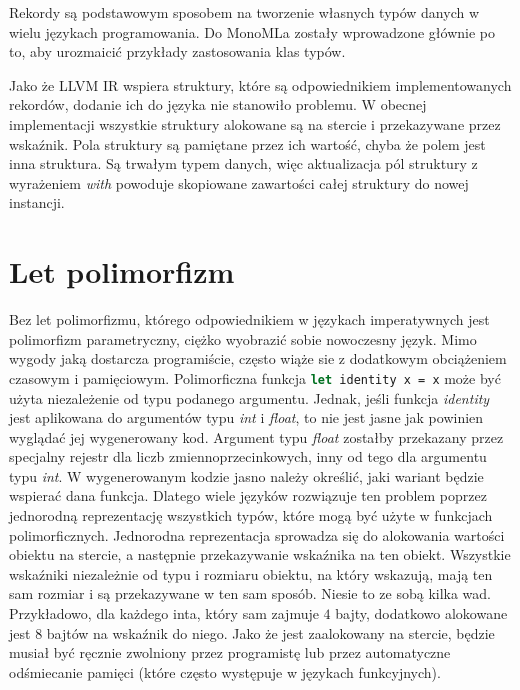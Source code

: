 \documentclass[declaration,shortabstract]{iithesis}
\begin{document}
Rekordy są podstawowym sposobem na tworzenie własnych typów danych w wielu 
językach programowania. Do MonoMLa zostały wprowadzone głównie po to, 
aby urozmaicić przykłady zastosowania klas typów. 

Jako że LLVM IR wspiera struktury, które są odpowiednikiem implementowanych 
rekordów, dodanie ich do języka nie stanowiło problemu. W obecnej 
implementacji 
wszystkie struktury alokowane są na stercie i przekazywane przez wskaźnik.
Pola struktury są pamiętane przez ich wartość, chyba że polem jest inna 
struktura. Są trwałym typem danych, więc aktualizacja pól struktury 
z wyrażeniem \textit{with} powoduje skopiowane zawartości całej struktury do 
nowej instancji.

\section{Let polimorfizm}


Bez let polimorfizmu, którego odpowiednikiem w językach imperatywnych jest 
polimorfizm parametryczny, ciężko wyobrazić sobie nowoczesny język. 
Mimo wygody jaką dostarcza programiście, często wiąże sie z dodatkowym
obciążeniem czasowym i pamięciowym. Polimorficzna funkcja 
\lstinline[language=Caml]!let identity x = x! może być użyta niezależenie
od typu podanego argumentu. Jednak, jeśli funkcja \textit{identity} 
jest aplikowana do argumentów typu \textit{int} i \textit{float}, to nie jest 
jasne jak powinien wyglądać jej wygenerowany kod. Argument typu \textit{float}
zostałby przekazany przez specjalny rejestr dla liczb zmiennoprzecinkowych, 
inny od tego dla argumentu typu \textit{int}. W wygenerowanym kodzie jasno
należy określić, jaki wariant będzie wspierać dana funkcja. Dlatego wiele 
języków rozwiązuje ten problem poprzez jednorodną reprezentację wszystkich 
typów, które mogą być użyte w funkcjach polimorficznych. Jednorodna 
reprezentacja sprowadza się do alokowania wartości obiektu na stercie, a 
następnie przekazywanie wskaźnika na ten obiekt. Wszystkie wskaźniki 
niezależnie od typu i rozmiaru obiektu, na który wskazują, mają ten sam 
rozmiar i są przekazywane w ten sam sposób. Niesie to ze sobą kilka wad.
Przykładowo, dla każdego inta, który sam zajmuje $4$ bajty,
dodatkowo alokowane jest $8$ bajtów na wskaźnik do niego. Jako że jest 
zaalokowany na stercie, będzie musiał być ręcznie zwolniony przez programistę 
lub przez automatyczne odśmiecanie pamięci (które często występuje w językach 
funkcyjnych).
\end{document}
